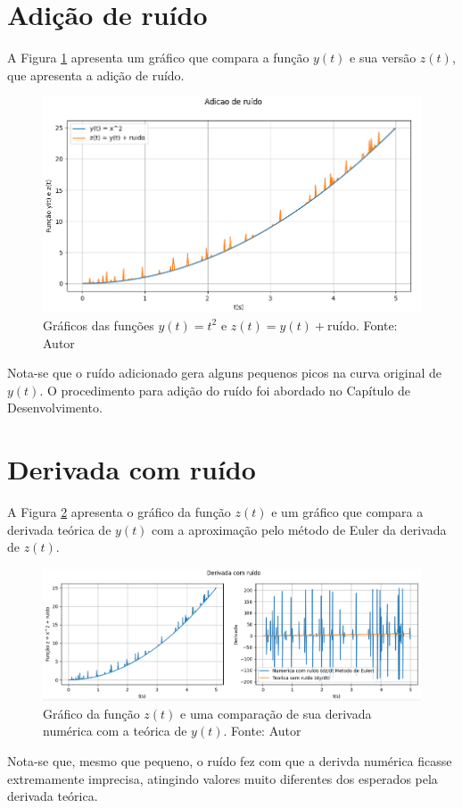 \documentclass[
	12pt,				%
	openany,			%
	twoside,			%
	a4paper,			%
	english,			%
	french,				%
	spanish,			%
	brazil,				%
	]{abntex2}
\begin{document}
\section{Adição de ruído}
A Figura \ref{fig:z} apresenta um gráfico que compara a função $y(t)$ e sua versão $z(t)$, que apresenta a adição de ruído.
\begin{figure}[H]
\center
    \includegraphics [scale = 0.5]{Figures/z.png}
    \caption{Gráficos das funções $y(t) = t^2$ e $z(t) = y(t) + \text{ruído}$. Fonte: Autor}
    \label{fig:z}
\end{figure}
Nota-se que o ruído adicionado gera alguns pequenos picos na curva original de $y(t)$. O procedimento para adição do ruído foi abordado no Capítulo de Desenvolvimento.

\section{Derivada com ruído}
A Figura \ref{fig:zd} apresenta o gráfico da função $z(t)$ e um gráfico que compara a derivada teórica de $y(t)$ com a aproximação pelo método de Euler da derivada de $z(t)$.
\begin{figure}[H]
\center
    \includegraphics [scale = 0.5]{Figures/zd.png}
    \caption{Gráfico da função $z(t)$ e uma comparação de sua derivada numérica com a teórica de $y(t)$. Fonte: Autor}
    \label{fig:zd}
\end{figure}
Nota-se que, mesmo que pequeno, o ruído fez com que a derivda numérica ficasse extremamente imprecisa, atingindo valores muito diferentes dos esperados pela derivada teórica.
\end{document}
